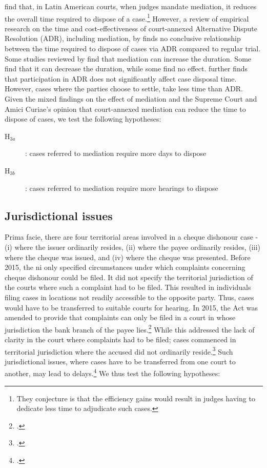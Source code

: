 \documentclass[12pt,a4paper]{article}
\begin{document}
\textcite{buscaglia1997_latinAmericaCourtDelays} find that, in Latin American courts, when judges mandate mediation, it reduces the overall time required to dispose of a case.\footnote{They conjecture is that the efficiency gains would result in judges having to dedicate less time to adjudicate such cases.} However, a review of empirical research on the time and cost-effectiveness of court-annexed Alternative Dispute Resolution (ADR), including mediation, by \textcite{wissler2004effectiveness} finds no conclusive relationship between the time required to dispose of cases via ADR compared to regular trial. Some studies reviewed by \textcite{wissler2004effectiveness} find that mediation can increase the duration. Some find that it can decrease the duration, while some find no effect. \textcite{heise2010adr} further finds that participation in ADR does not significantly affect case disposal time. However, cases where the parties choose to settle, take less time than ADR. Given the mixed findings on the effect of mediation and the Supreme Court and Amici Curiae's opinion that court-annexed mediation can reduce the time to dispose of cases, we test the following hypotheses:

\begin{description}
\item[H$_{3a}$]: cases referred to mediation require more days to dispose
\item[H$_{3b}$]: cases referred to mediation require more hearings to dispose
\end{description}

\subsection{Jurisdictional issues}

Prima facie, there are four territorial areas involved in a cheque dishonour case - (i) where the issuer ordinarily resides, (ii) where the payee ordinarily resides, (iii) where the cheque was issued, and (iv) where the cheque was presented. Before 2015, the \gls{ni} only specified circumstances under which complaints concerning cheque dishonour could be filed. It did not specify the territorial jurisdiction of the courts where such a complaint had to be filed. This resulted in individuals filing cases in locations not readily accessible to the opposite party. Thus, cases would have to be transferred to suitable courts for hearing. In 2015, the Act was amended to provide that complaints can only be filed in a court in whose jurisdiction the bank branch of the payee lies.\footcite{niAmend2015} While this addressed the lack of clarity in the court where complaints had to be filed; cases commenced in territorial jurisdiction where the accused did not ordinarily reside.\footcite{amicus2020_submission} Such jurisdictional issues, where cases have to be transferred from one court to another, may lead to delays.\footcite{sc2020_138, amicus2020_submission} We thus test the following hypotheses:
\end{document}
